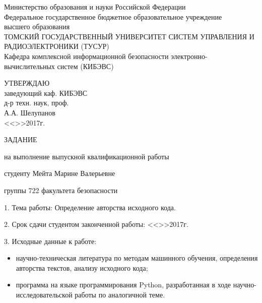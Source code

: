  \newpage

\begin{center}
 Министерство образования и науки Российской Федерации\\
 Федеральное государственное бюджетное образовательное учреждение\\ высшего образования\\
 ТОМСКИЙ ГОСУДАРСТВЕННЫЙ УНИВЕРСИТЕТ СИСТЕМ УПРАВЛЕНИЯ И РАДИОЭЛЕКТРОНИКИ (ТУСУР)\\
 Кафедра комплексной информационной безопасности электронно-\\вычислительных систем (КИБЭВС)\\
\end{center} 

\vfill

\begin{flushright}
\begin{minipage}{0.45\textwidth}
 \begin{flushleft}
  УТВЕРЖДАЮ\\
  заведующий каф. КИБЭВС\\
  д-р техн. наук, проф.\\
  \underline{\hspace{3cm}}А.А. Шелупанов \\
  <<\underline{\hspace{1cm}}>>\underline{\hspace{3cm}}2017г.\\
 \end{flushleft}
\end{minipage}
\end{flushright}

\vfill



\begin{center}
ЗАДАНИЕ

на выполнение выпускной квалификационной работы

студенту Мейта Марине Валерьевне

группы 722 факультета безопасности
\end{center}


1. Тема работы: Определение авторства исходного кода.

2. Срок сдачи студентом законченной работы:
<<\underline{\hspace{1cm}}>>\underline{\hspace{3cm}}2017г.

3. Исходные данные к работе:
\begin{itemize}
 \item научно-техническая литература по методам машинного обучения,
определения авторства текстов, анализу исходного кода;
 \item программа на языке программирования Python, разработанная в ходе
научно-исследовательской работы по аналогичной теме.
\end{itemize}

